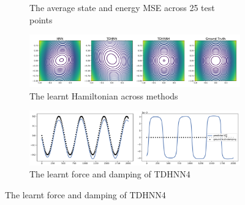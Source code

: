 \documentclass[twoside]{article}
\begin{document}
\begin{figure}[!htb]
\begin{subfigure}[b]{0.48\textwidth}
\caption{The average state and energy MSE across 25 test points}
\end{subfigure}
\begin{subfigure}[b]{0.48\textwidth}
\includegraphics[width=\textwidth]{figures/figures/relativity/1/relativity_ham.pdf}
\caption{The learnt Hamiltonian across methods}
\end{subfigure}
\begin{subfigure}[b]{0.48\textwidth}
\includegraphics[width=\textwidth]{figures/figures/relativity/1/relativity_dpdt_0.pdf}
\caption{The learnt force and damping of TDHNN4}
\end{subfigure}
\label{duffing_1_full}
\end{figure}

\pagebreak
\onecolumn
\end{document}
